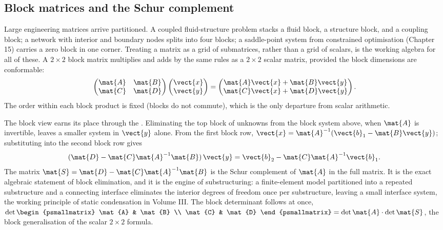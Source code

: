 \subsection{Block matrices and the Schur complement}

Large engineering matrices arrive partitioned. A coupled
fluid-structure problem stacks a fluid block, a structure block, and
a coupling block; a network with interior and boundary nodes splits
into four blocks; a saddle-point system from constrained optimisation
(Chapter 15) carries a zero block in one corner. Treating a matrix as
a grid of submatrices, rather than a grid of scalars, is the working
algebra for all of these. A $2 \times 2$ block matrix multiplies and
adds by the same rules as a $2 \times 2$ scalar matrix, provided the
block dimensions are conformable:
\[
\begin{pmatrix} \mat{A} & \mat{B} \\ \mat{C} & \mat{D} \end{pmatrix}
\begin{pmatrix} \vect{x} \\ \vect{y} \end{pmatrix}
= \begin{pmatrix} \mat{A}\vect{x} + \mat{B}\vect{y} \\
\mat{C}\vect{x} + \mat{D}\vect{y} \end{pmatrix}.
\]
The order within each block product is fixed (blocks do not commute),
which is the only departure from scalar arithmetic.

The block view earns its place through the . Eliminating the top block of unknowns from the block
system above, when $\mat{A}$ is invertible, leaves a smaller system
in $\vect{y}$ alone. From the first block row, $\vect{x} =
\mat{A}^{-1}(\vect{b}_{1} - \mat{B}\vect{y})$; substituting into the
second block row gives
\[
(\mat{D} - \mat{C}\mat{A}^{-1}\mat{B})\,\vect{y} = \vect{b}_{2} -
\mat{C}\mat{A}^{-1}\vect{b}_{1}.
\]
The matrix $\mat{S} = \mat{D} - \mat{C}\mat{A}^{-1}\mat{B}$ is the
Schur complement of $\mat{A}$ in the full matrix. It is the exact
algebraic statement of block elimination, and it is the engine of
substructuring: a finite-element model partitioned into a repeated
substructure and a connecting interface eliminates the interior
degrees of freedom once per substructure, leaving a small interface
system, the working principle of static condensation in Volume III.
The block determinant follows at once, $\det \begin{psmallmatrix}
\mat{A} & \mat{B} \\ \mat{C} & \mat{D} \end{psmallmatrix} = \det
\mat{A} \cdot \det \mat{S}$, the block generalisation of the scalar
$2 \times 2$ formula.

